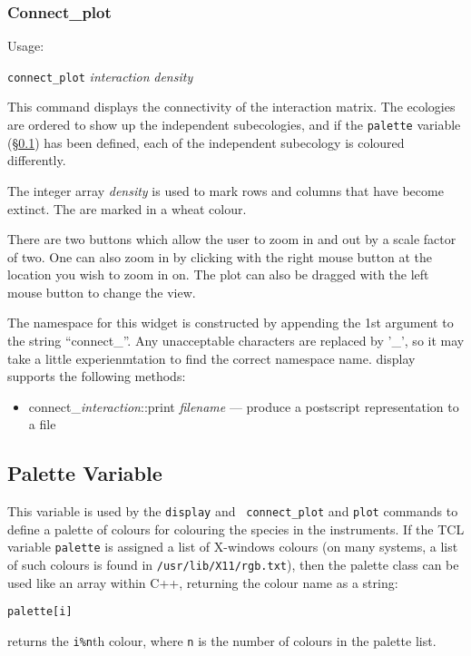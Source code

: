 \subsubsection{Connect\_plot}\label{connect}

Usage:

{\tt connect\_plot} {\em interaction} {\em density} 


This command displays the connectivity of the interaction matrix. The
ecologies are ordered to show up the independent subecologies, and if
the {\tt palette} variable (\S\ref{palette}) has been defined, each of
the independent subecology is coloured differently.

The integer array {\em density} is used to mark rows and columns that
have become extinct. The are marked in a wheat colour.

There are two buttons which allow the user to zoom in and out by a
scale factor of two.  One can also zoom in by clicking with the right
mouse button at the location you wish to zoom in on.  The plot can
also be dragged with the left mouse button to change the view.

The namespace for this widget is constructed by appending the 1st
argument to the string ``connect\_''. Any unacceptable characters are
replaced by '\_', so it may take a little experienmtation to find the
correct namespace name.
display supports the following methods:
\begin{itemize}
\item connect\_{\em interaction}::print {\em filename} --- produce a postscript
  representation to a file
\end{itemize}


\subsection{Palette Variable}\label{palette}

This variable is used by the {\tt display} and {\tt
  connect\_plot} and {\tt plot}
commands to define a palette of colours for colouring the species in
the instruments. If the TCL variable {\tt palette} is
assigned a list of X-windows colours (on many systems, a list of such
colours is found in {\tt /usr/lib/X11/rgb.txt}), then the palette
class can be used like an array within C++, returning the colour name
as a string:
\begin{verbatim}
palette[i]
\end{verbatim}
returns the \verb|i%n|th colour, where {\tt n} is the number of
colours in the palette list.

